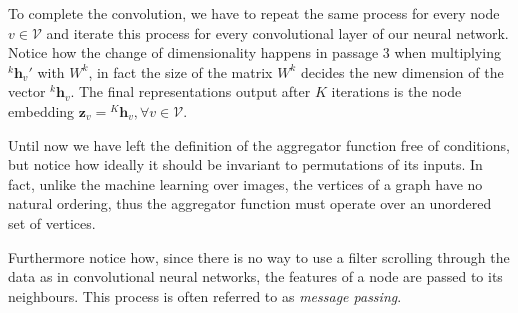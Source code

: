 \documentclass[12pt,a4paper]{report}
\theoremstyle{definition}
\begin{document}
To complete the convolution, we have to repeat the same process for every node $v \in \mathcal{V}$ and iterate this process for every convolutional layer of our neural network.
Notice how the change of dimensionality happens in passage $3$ when multiplying ${^k\mathbf{h}_v '}$ with $W^k$, in fact the size of the matrix $W^k$ decides the new dimension of the vector $^k \mathbf{h}_v $.
The final representations output after $K$ iterations is the node embedding $\mathbf{z}_v = { ^K \mathbf{h}_v}, \forall v \in \mathcal{V}$.

Until now we have left the definition of the aggregator function free of conditions, but notice how ideally it should be invariant to permutations of its inputs.
In fact, unlike the machine learning over images, the vertices of a graph have no natural ordering, thus the aggregator function must operate over an unordered set of vertices.

Furthermore notice how, since there is no way to use a filter scrolling through the data as in convolutional neural networks, the features of a node are passed to its neighbours.
This process is often referred to as \emph{message passing}.
\end{document}
